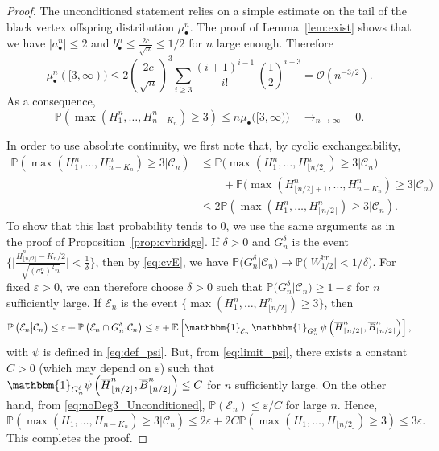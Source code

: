 \documentclass[10pt]{amsart}
\theoremstyle{definition}\newtheorem{defi}[theo]{Definition}\newtheorem{rema}[theo]{Remark}\newtheorem{exam}[theo]{Example}\newtheorem{exem}[theo]{Example}\newtheorem{nota}[theo]{Notation}
\def\eps{\varepsilon}
\def\EEE{\mathcal E}
\def\mub{\mu_{\bullet}}
\def\mubn{\mu_{\bullet}^{n}}
\def\sbn{\sigma_{\bullet}^{n}}
\def\oB{\overline{B}}
\def\oH{\overline{H}}
\renewcommand{\epsilon}{\varepsilon}
\newcommand\Es[1]{\mathbb{E}\left[#1\right]}
\renewcommand\Pr[1]{\mathbb{P}\left(#1\right)}
\newcommand\Prb[1]{\mathbb{P}\big(#1\big)}
\begin{document}
\begin{proof}
The unconditioned statement relies on a simple estimate on the tail of the black vertex offspring distribution $\mubn$.
 The proof of Lemma~\ref{lem:exist} shows that we have $|a_\bullet^n| \le 2$ and $b_\bullet^n \le \tfrac{2 c}{\sqrt{n}} \le 1/2$ for $n$ large enough. Therefore
  \begin{equation}
    \mubn([3,\infty))\le 2 \left(\frac{2 c}{\sqrt{n}} \right)^3  \sum_{i \ge 3} \frac{(i+1)^{i-1}}{i!} \, \left(\frac{1}{2}\right)^{i-3}=\mathcal O(n^{-3/2}).
    \label{eq:tail_mub}
  \end{equation}
  As a consequence,
  \begin{equation}
    \Pr{\max(H^{n}_{1}, \ldots, H^{n}_{n-K_{n}}) \geq 3} \leq n  \mub\big([3,\infty)\big)  \quad \mathop{\longrightarrow}_{n \rightarrow \infty} \quad 0.
    \label{eq:noDeg3_Unconditioned}
  \end{equation}


  In order to use absolute continuity,
  we first note that, by cyclic exchangeability,
  \begin{align*}
    \Pr{\max(H^{n}_{1}, \ldots, H^{n}_{n-K_{n}})  \geq 3 \big| \mathcal{C}_{n} } &\leq
\Prb{\max(H^{n}_{1}, \ldots, H^{n}_{\lfloor n/2 \rfloor})  \geq 3 \big| \mathcal{C}_{n} }\\
&\qquad + \Prb{\max(H^{n}_{\lfloor n/2 \rfloor+1}, \ldots, H^{n}_{n-K_{n}})  \geq 3 \big| \mathcal{C}_{n} }\\
&\le 2\Pr{\max(H^{n}_{1}, \ldots, H^{n}_{\lfloor n/2 \rfloor})  \geq 3 \big| \mathcal{C}_{n} }.
\end{align*}
To show that this last probability tends to $0$,
we use the same arguments as in the proof  of Proposition~\ref{prop:cvbridge}.
If $\delta >0$ and $G^{\delta}_{n}$  is the event $  \big\{\big| \tfrac{\oH^{n}_{ \lfloor  n /2 \rfloor } -  K_{n}/2 }{\sqrt{ (\sbn)^{2} n} } \big| < \tfrac{1}{\delta} \big\}$, then by \eqref{eq:cvE},
we have $\Prb{G^{\delta}_{n} | \mathcal{C}_{n}  } \rightarrow \Prb{|W^{\mathrm{br}}_{1/2}| <1/\delta}$.
For fixed $\epsilon>0$, we can therefore choose $\delta>0$ such that $\Prb{G^{\delta}_{n} \big| \mathcal{C}_{n} } \geq 1- \epsilon$ for $n$ sufficiently large. If $ \EEE_{n}$ is the event $\{\max(H^{n}_{1}, \ldots, H^{n}_{\lfloor n/2 \rfloor})  \geq 3\}$,  then
\[\Pr{ \EEE_{n} \big | \mathcal{C}_{n}  } \le \epsilon + \Pr{ \EEE_{n} \cap G^\delta_n \big| \mathcal{C}_{n} }
\leq \epsilon+ \Es{ \mathbbm{1}_{\EEE_n}\, \mathbbm{1}_{G^\delta_n} \,  \psi \left( \oH^{n}_{ \lfloor n/2 \rfloor },\oB^{n}_{ \lfloor    n/2 \rfloor } \right)},\]
with $\psi$ is defined in \eqref{eq:def_psi}.
But, from \eqref{eq:limit_psi}, there exists a constant $C>0$ (which may depend on $\epsilon$) such that
$\mathbbm{1}_{G^\delta_n} \psi \left( \oH^{n}_{ \lfloor n/2 \rfloor },\oB^{n}_{ \lfloor    n/2 \rfloor } \right) \leq C$ for $n$ sufficiently large.
On the other hand, from \eqref{eq:noDeg3_Unconditioned},
$\mathbb{P}(\EEE_n) \le \eps/C$ for large $n$.
Hence,
\[\Pr{\max(H_{1}, \ldots, H_{n-K_{n}})  \geq 3 \big| \mathcal{C}_{n} } \leq  2\epsilon + 2C \Pr{\max(H_{1}, \ldots, H_{\lfloor n/2 \rfloor}) \geq 3} \leq 3\epsilon.\]
This completes the proof.
\end{proof}
\end{document}
